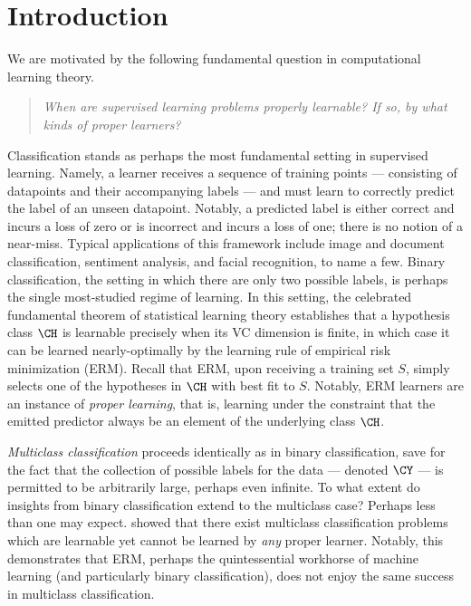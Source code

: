 \documentclass[11pt]{article}
\begin{document}
\section{Introduction}\label{Section:Introduction}

We are motivated by the following fundamental question in computational learning theory.

\begin{quote}
\begin{center}
\emph{When are supervised learning problems properly learnable? \linebreak
If so, by what kinds of proper learners?}
\end{center}
\end{quote}

Classification stands as perhaps the most fundamental setting in supervised learning. Namely, a learner receives a sequence of training points --- consisting of datapoints and their accompanying labels --- and must learn to correctly predict the label of an unseen datapoint. Notably, a predicted label is either correct and incurs a loss of zero or is incorrect and incurs a loss of one; there is no notion of a near-miss. Typical applications of this framework include image and document classification, sentiment analysis, and facial recognition, to name a few. Binary classification, the setting in which there are only two possible labels, is perhaps the single most-studied regime of learning. In this setting, the celebrated fundamental theorem of statistical learning theory establishes that a hypothesis class $\CH$ is learnable precisely when its VC dimension is finite, in which case it can be learned nearly-optimally by the learning rule of empirical risk minimization (ERM). Recall that ERM, upon receiving a training set $S$, simply selects one of the hypotheses in $\CH$ with best fit to $S$. Notably, ERM learners are an instance of \emph{proper learning}, that is, learning under the constraint that the emitted predictor always be an element of the underlying class $\CH$. 

\emph{Multiclass classification} proceeds identically as in binary classification, save for the fact that the collection of possible labels for the data --- denoted $\CY$ --- is permitted to be arbitrarily large, perhaps even infinite. To what extent do insights from binary classification extend to the multiclass case? Perhaps less than one may expect. \citet{DS14} showed that there exist multiclass classification problems which are learnable yet cannot be learned by \emph{any} proper learner. Notably, this demonstrates that ERM, perhaps the quintessential workhorse of machine learning (and particularly binary classification), does not enjoy the same success in multiclass classification. 
\end{document}
